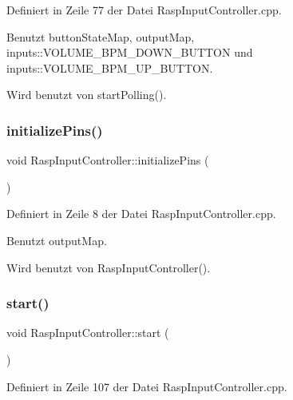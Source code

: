 Definiert in Zeile 77 der Datei Rasp\+Input\+Controller.\+cpp.



Benutzt button\+State\+Map, output\+Map, inputs\+::\+V\+O\+L\+U\+M\+E\+\_\+\+B\+P\+M\+\_\+\+D\+O\+W\+N\+\_\+\+B\+U\+T\+T\+ON und inputs\+::\+V\+O\+L\+U\+M\+E\+\_\+\+B\+P\+M\+\_\+\+U\+P\+\_\+\+B\+U\+T\+T\+ON.



Wird benutzt von start\+Polling().

\mbox{\label{class_rasp_input_controller_a5ffc6f68b0c74f31a9b595ff8acc49f1}} 
\subsubsection{\texorpdfstring{initialize\+Pins()}{initializePins()}}
{\footnotesize\ttfamily void Rasp\+Input\+Controller\+::initialize\+Pins (\begin{DoxyParamCaption}{ }\end{DoxyParamCaption})\hspace{0.3cm}{\ttfamily [private]}}



Definiert in Zeile 8 der Datei Rasp\+Input\+Controller.\+cpp.



Benutzt output\+Map.



Wird benutzt von Rasp\+Input\+Controller().

\mbox{\label{class_rasp_input_controller_a8cb185caa124285987d6b98122cfbea4}} 
\subsubsection{\texorpdfstring{start()}{start()}}
{\footnotesize\ttfamily void Rasp\+Input\+Controller\+::start (\begin{DoxyParamCaption}{ }\end{DoxyParamCaption})}



Definiert in Zeile 107 der Datei Rasp\+Input\+Controller.\+cpp.



